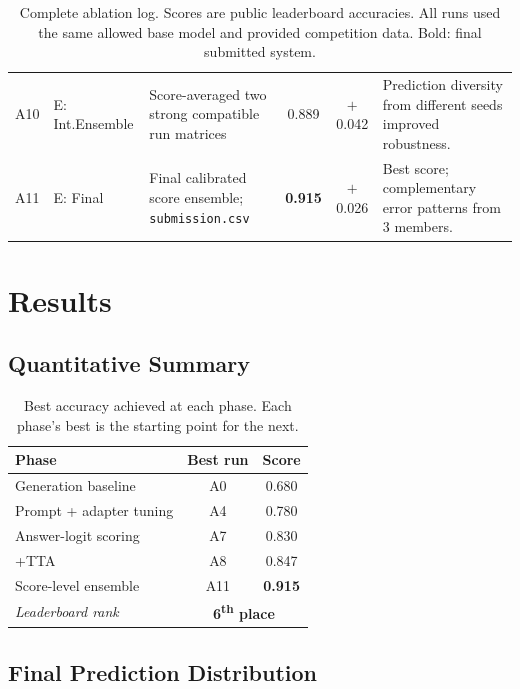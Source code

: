 \documentclass[11pt,twocolumn]{article}
\begin{document}
\begin{table}[t]
\begin{tabular}{p{0.6cm}p{1.9cm}p{4.4cm}cc p{5.2cm}}
A10 & E: Int.Ensemble & Score-averaged two strong compatible run matrices & 0.889 & $+$0.042 & Prediction diversity from different seeds improved robustness.\\
A11 & E: Final       & Final calibrated score ensemble; \texttt{submission.csv} & \textbf{0.915} & $+$0.026 & Best score; complementary error patterns from 3 members.\\
\bottomrule
\end{tabular}
\caption{Complete ablation log. Scores are public leaderboard accuracies. All runs used the same allowed base model and provided competition data. Bold: final submitted system.}
\label{tab:ablations}
\end{table}

\section{Results}
\label{sec:results}

\subsection{Quantitative Summary}

\begin{table}[h]
\centering
\small
\setlength{\tabcolsep}{5pt}
\begin{tabular}{lcc}
\toprule
\textbf{Phase} & \textbf{Best run} & \textbf{Score}\\
\midrule
Generation baseline     & A0      & 0.680\\
Prompt + adapter tuning & A4      & 0.780\\
Answer-logit scoring    & A7      & 0.830\\
+TTA                    & A8      & 0.847\\
Score-level ensemble    & A11     & \textbf{0.915}\\
\midrule
\textit{Leaderboard rank} & \multicolumn{2}{c}{\textbf{6\textsuperscript{th} place}}\\
\bottomrule
\end{tabular}
\caption{Best accuracy achieved at each phase. Each phase's best is the starting point for the next.}
\label{tab:summary}
\end{table}

\subsection{Final Prediction Distribution}
\end{document}
